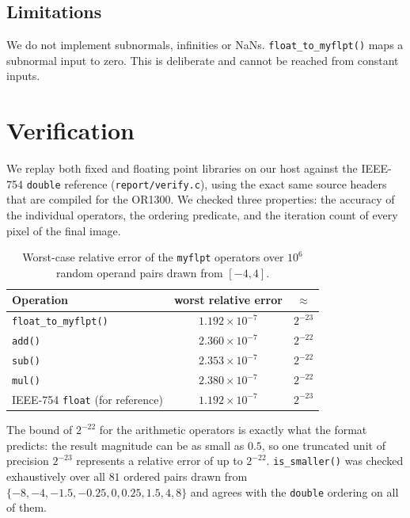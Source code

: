 \documentclass[10pt,a4paper]{article}
\begin{document}
\subsection{Limitations}
\label{sec:myflpt-limits}

We do not implement subnormals, infinities or NaNs. 
\texttt{float\_to\_myflpt()} maps a subnormal input to zero. 
This is deliberate and cannot be reached from constant inputs.

\section{Verification}
\label{sec:verif}

We replay both fixed and floating point libraries on our host against the IEEE-754 \texttt{double} reference (\texttt{report/verify.c}), using the exact same source headers that are compiled for the OR1300. 
We checked three properties: the accuracy of the individual operators, the ordering
predicate, and the iteration count of every pixel of the final image.

\begin{table}[h]
\centering\small
\caption{Worst-case relative error of the \texttt{myflpt} operators over $10^6$ random operand
pairs drawn from $[-4, 4]$.}
\label{tab:accuracy}
\begin{tabular}{lcc}
\toprule
\textbf{Operation} & \textbf{worst relative error} & \textbf{$\approx$} \\
\midrule
\texttt{float\_to\_myflpt()} & $1.192 \times 10^{-7}$ & $2^{-23}$ \\
\texttt{add()}               & $2.360 \times 10^{-7}$ & $2^{-22}$ \\
\texttt{sub()}               & $2.353 \times 10^{-7}$ & $2^{-22}$ \\
\texttt{mul()}               & $2.380 \times 10^{-7}$ & $2^{-22}$ \\
\midrule
IEEE-754 \texttt{float} (for reference) & $1.192 \times 10^{-7}$ & $2^{-23}$ \\
\bottomrule
\end{tabular}
\end{table}

The bound of $2^{-22}$ for the arithmetic operators is exactly what the format predicts: the result
magnitude can be as small as $0.5$, so one truncated unit of precision $2^{-23}$ represents a relative error
of up to $2^{-22}$. \texttt{is\_smaller()} was checked exhaustively over all $81$ ordered pairs
drawn from $\{-8, -4, -1.5, -0.25, 0, 0.25, 1.5, 4, 8\}$ and agrees with the \texttt{double}
ordering on all of them.
\end{document}
